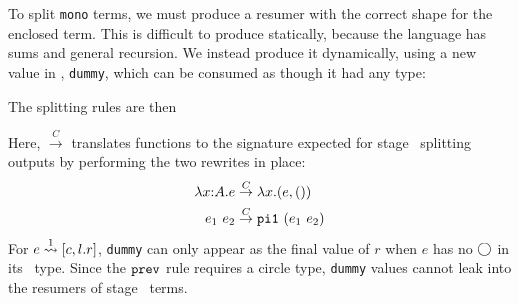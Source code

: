 To split \texttt{mono} terms, we must produce a resumer with the correct shape
for the enclosed term. This is difficult to produce statically, because the
language has sums and general recursion. We instead produce it dynamically,
using a new value in \langmono, \texttt{dummy}, which can be consumed as though
it had any type:
The splitting rules are then
\begin{mathpar}
\end{mathpar}
Here, $\overset{C}{\rightarrow}$ translates functions to the signature expected for stage \bbone\ splitting outputs
by performing the two rewrites in place:
\begin{align*}
\lam x A e &\overset{C}{\rightarrow} \lambda x.(e,())\\
e_1~e_2 &\overset{C}{\rightarrow} \pio~(e_1~e_2)
\end{align*}
For $\splitone e A {c,l.r}$, \texttt{dummy} can only appear as the 
final value of $r$ when $e$ has no $\fut$ in its \lang\ type.
Since the $\prev$ rule requires a circle type, \texttt{dummy} values cannot leak 
into the resumers of stage \bbtwo\ terms.
